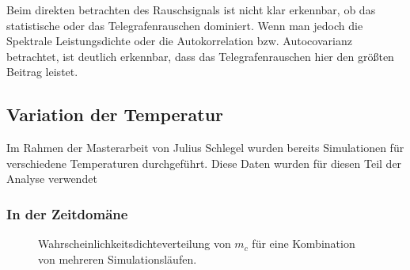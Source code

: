 \documentclass[main.tex]{subfiles}
\begin{document}
Beim direkten betrachten des Rauschsignals ist nicht klar erkennbar, ob das statistische oder das Telegrafenrauschen dominiert. Wenn man jedoch die Spektrale Leistungsdichte oder die Autokorrelation bzw. Autocovarianz betrachtet, ist deutlich erkennbar, dass das Telegrafenrauschen hier den größten Beitrag leistet.


\subsection{Variation der Temperatur}

Im Rahmen der Masterarbeit von Julius Schlegel \cite{schlegel-master} wurden bereits Simulationen für verschiedene Temperaturen durchgeführt. Diese Daten wurden für diesen Teil der Analyse verwendet

\subsubsection{In der Zeitdomäne}

\begin{figure}[H]
    \centering
    \caption{Wahrscheinlichkeitsdichteverteilung von \(m_c\) für eine Kombination von mehreren Simulationsläufen.}\label{fig:temp-hist}    
\end{figure}
\end{document}
